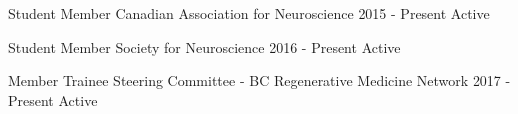 

\begin{cvhonors}

  \cvhonor
    {Student Member} %
    {Canadian Association for Neuroscience} %
    {2015 - Present} %
    {Active} %

  \cvhonor
    {Student Member} %
    {Society for Neuroscience} %
    {2016 - Present} %
    {Active} %

  \cvhonor
    {Member} %
    {Trainee Steering Committee - BC Regenerative Medicine Network} %
    {2017 - Present} %
    {Active} %



\end{cvhonors}
